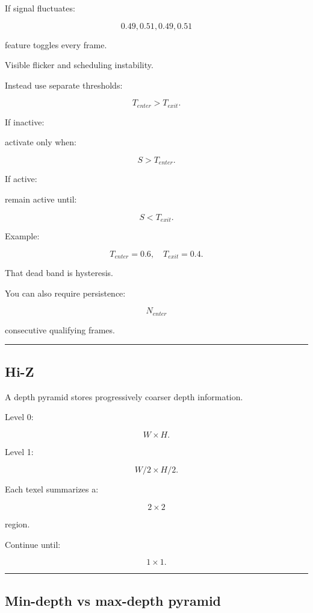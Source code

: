 If signal fluctuates:

\[
0.49,0.51,0.49,0.51
\]

feature toggles every frame.

Visible flicker and scheduling instability.

Instead use separate thresholds:

\[
\boxed{
T_{enter}>T_{exit}.
}
\]

If inactive:

activate only when:

\[
S>T_{enter}.
\]

If active:

remain active until:

\[
S<T_{exit}.
\]

Example:

\[
T_{enter}=0.6,
\quad
T_{exit}=0.4.
\]

That dead band is hysteresis.

You can also require persistence:

\[
N_{enter}
\]

consecutive qualifying frames.

\begin{center}\rule{0.5\linewidth}{0.5pt}\end{center}

\subsection{Hi-Z}\label{04-visual-computing-ii-ch040-hi-z}

\hypertarget{04-visual-computing-ii-ch040-hi-z}{}

A depth pyramid stores progressively coarser depth information.

Level 0:

\[
W\times H.
\]

Level 1:

\[
W/2\times H/2.
\]

Each texel summarizes a:

\[
2\times2
\]

region.

Continue until:

\[
1\times1.
\]

\begin{center}\rule{0.5\linewidth}{0.5pt}\end{center}

\subsection{Min-depth vs max-depth pyramid}\label{04-visual-computing-ii-ch040-min-depth-vs-max-depth-pyramid}

